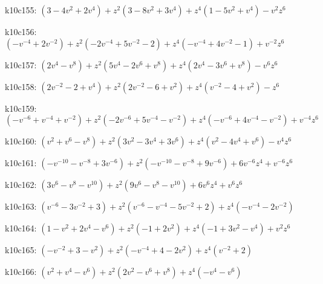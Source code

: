 k10c155: $ (3-4v^{2}+2v^{4})  +z^{2}(3-8v^{2}+3v^{4})  +z^{4}(1-5v^{2}+v^{4})  -v^{2}z^{6} $ 

k10c156: $ (-v^{-4}+2v^{-2})  +z^{2}(-2v^{-4}+5v^{-2}-2)  +z^{4}(-v^{-4}+4v^{-2}-1)  +v^{-2}z^{6} $ 

k10c157: $ (2v^{4}-v^{8})  +z^{2}(5v^{4}-2v^{6}+v^{8})  +z^{4}(2v^{4}-3v^{6}+v^{8})  -v^{6}z^{6} $ 

k10c158: $ (2v^{-2}-2+v^{4})  +z^{2}(2v^{-2}-6+v^{2})  +z^{4}(v^{-2}-4+v^{2})  -z^{6} $ 

k10c159: $ (-v^{-6}+v^{-4}+v^{-2})  +z^{2}(-2v^{-6}+5v^{-4}-v^{-2})  +z^{4}(-v^{-6}+4v^{-4}-v^{-2})  +v^{-4}z^{6} $ 

k10c160: $ (v^{2}+v^{6}-v^{8})  +z^{2}(3v^{2}-3v^{4}+3v^{6})  +z^{4}(v^{2}-4v^{4}+v^{6})  -v^{4}z^{6} $ 

k10c161: $ (-v^{-10}-v^{-8}+3v^{-6})  +z^{2}(-v^{-10}-v^{-8}+9v^{-6})  +6v^{-6}z^{4}  +v^{-6}z^{6} $ 

k10c162: $ (3v^{6}-v^{8}-v^{10})  +z^{2}(9v^{6}-v^{8}-v^{10})  +6v^{6}z^{4}  +v^{6}z^{6} $ 

k10c163: $ (v^{-6}-3v^{-2}+3)  +z^{2}(v^{-6}-v^{-4}-5v^{-2}+2)  +z^{4}(-v^{-4}-2v^{-2}) $ 

k10c164: $ (1-v^{2}+2v^{4}-v^{6})  +z^{2}(-1+2v^{2})  +z^{4}(-1+3v^{2}-v^{4})  +v^{2}z^{6} $ 

k10c165: $ (-v^{-2}+3-v^{2})  +z^{2}(-v^{-4}+4-2v^{2})  +z^{4}(v^{-2}+2) $ 

k10c166: $ (v^{2}+v^{4}-v^{6})  +z^{2}(2v^{2}-v^{6}+v^{8})  +z^{4}(-v^{4}-v^{6}) $ 

